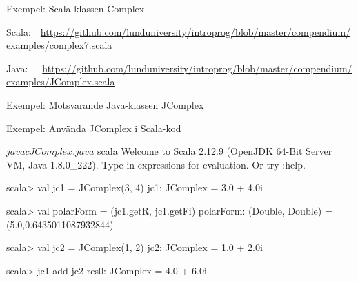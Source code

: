 \begin{Slide}{Exempel: Scala-klassen Complex}

{\SlideFontTiny Scala:~~\url{https://github.com/lunduniversity/introprog/blob/master/compendium/examples/complex7.scala}}

{\SlideFontTiny Java:~~~\url{https://github.com/lunduniversity/introprog/blob/master/compendium/examples/JComplex.scala}}

\end{Slide}
  

\begin{Slide}{Exempel: Motsvarande Java-klassen JComplex}\SlideFontTiny\SlideOnly{\vspace{-1em}}
\end{Slide}

  
  


\begin{Slide}{Exempel: Använda JComplex i Scala-kod}
\begin{REPL}
$ javac JComplex.java
$ scala
Welcome to Scala 2.12.9 (OpenJDK 64-Bit Server VM, Java 1.8.0_222).
Type in expressions for evaluation. Or try :help.

scala> val jc1 = JComplex(3, 4)
jc1: JComplex = 3.0 + 4.0i

scala> val polarForm = (jc1.getR, jc1.getFi)
polarForm: (Double, Double) = (5.0,0.6435011087932844)

scala> val jc2 = JComplex(1, 2)
jc2: JComplex = 1.0 + 2.0i

scala> jc1 add jc2
res0: JComplex = 4.0 + 6.0i
\end{REPL}
\end{Slide}




